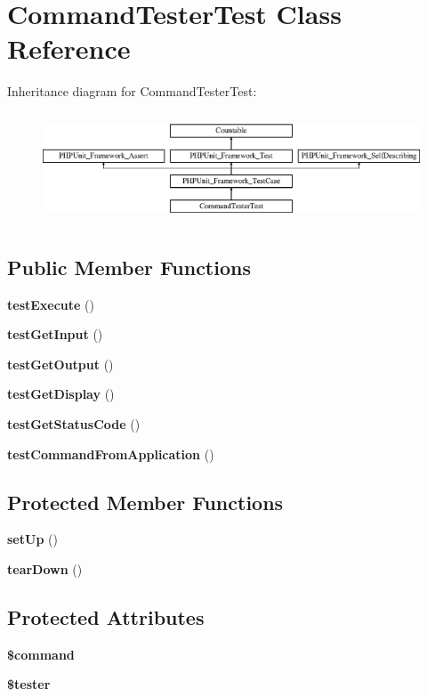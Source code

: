\section{Command\+Tester\+Test Class Reference}
\label{class_symfony_1_1_component_1_1_console_1_1_tests_1_1_tester_1_1_command_tester_test}
Inheritance diagram for Command\+Tester\+Test\+:\begin{figure}[H]
\begin{center}
\leavevmode
\includegraphics[height=3.303835cm]{class_symfony_1_1_component_1_1_console_1_1_tests_1_1_tester_1_1_command_tester_test}
\end{center}
\end{figure}
\subsection*{Public Member Functions}
\begin{DoxyCompactItemize}
\item 
{\bf test\+Execute} ()
\item 
{\bf test\+Get\+Input} ()
\item 
{\bf test\+Get\+Output} ()
\item 
{\bf test\+Get\+Display} ()
\item 
{\bf test\+Get\+Status\+Code} ()
\item 
{\bf test\+Command\+From\+Application} ()
\end{DoxyCompactItemize}
\subsection*{Protected Member Functions}
\begin{DoxyCompactItemize}
\item 
{\bf set\+Up} ()
\item 
{\bf tear\+Down} ()
\end{DoxyCompactItemize}
\subsection*{Protected Attributes}
\begin{DoxyCompactItemize}
\item 
{\bf \$command}
\item 
{\bf \$tester}
\end{DoxyCompactItemize}
